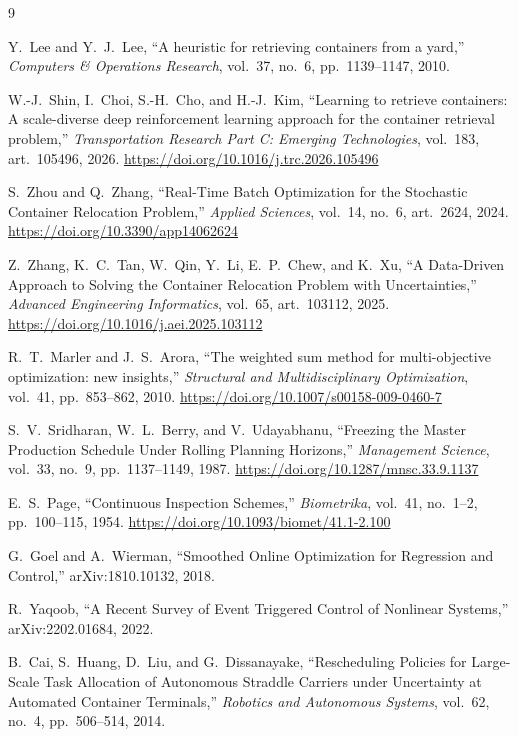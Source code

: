 \documentclass[11pt]{article}
\begin{document}
\begin{thebibliography}{9}

Y.~Lee and Y.~J.~Lee, ``A heuristic for retrieving containers from a
yard,'' \emph{Computers \& Operations Research}, vol.~37, no.~6, pp.~1139--1147, 2010.

W.-J.~Shin, I.~Choi, S.-H.~Cho, and H.-J.~Kim, ``Learning to retrieve
containers: A scale-diverse deep reinforcement learning approach for the
container retrieval problem,'' \emph{Transportation Research Part C:
Emerging Technologies}, vol.~183, art.~105496, 2026.
\url{https://doi.org/10.1016/j.trc.2026.105496}

S.~Zhou and Q.~Zhang, ``Real-Time Batch Optimization for the Stochastic
Container Relocation Problem,'' \emph{Applied Sciences}, vol.~14, no.~6,
art.~2624, 2024. \url{https://doi.org/10.3390/app14062624}

Z.~Zhang, K.~C.~Tan, W.~Qin, Y.~Li, E.~P.~Chew, and K.~Xu, ``A
Data-Driven Approach to Solving the Container Relocation Problem with
Uncertainties,'' \emph{Advanced Engineering Informatics}, vol.~65,
art.~103112, 2025. \url{https://doi.org/10.1016/j.aei.2025.103112}

R.~T.~Marler and J.~S.~Arora, ``The weighted sum method for
multi-objective optimization: new insights,'' \emph{Structural and
Multidisciplinary Optimization}, vol.~41, pp.~853--862, 2010.
\url{https://doi.org/10.1007/s00158-009-0460-7}

S.~V.~Sridharan, W.~L.~Berry, and V.~Udayabhanu, ``Freezing the Master
Production Schedule Under Rolling Planning Horizons,'' \emph{Management
Science}, vol.~33, no.~9, pp.~1137--1149, 1987.
\url{https://doi.org/10.1287/mnsc.33.9.1137}

E.~S.~Page, ``Continuous Inspection Schemes,'' \emph{Biometrika}, vol.~41,
no.~1--2, pp.~100--115, 1954. \url{https://doi.org/10.1093/biomet/41.1-2.100}

G.~Goel and A.~Wierman, ``Smoothed Online Optimization for Regression and
Control,'' arXiv:1810.10132, 2018.

R.~Yaqoob, ``A Recent Survey of Event Triggered Control of Nonlinear
Systems,'' arXiv:2202.01684, 2022.

B.~Cai, S.~Huang, D.~Liu, and G.~Dissanayake, ``Rescheduling Policies for
Large-Scale Task Allocation of Autonomous Straddle Carriers under
Uncertainty at Automated Container Terminals,'' \emph{Robotics and
Autonomous Systems}, vol.~62, no.~4, pp.~506--514, 2014.

\end{thebibliography}
\end{document}
